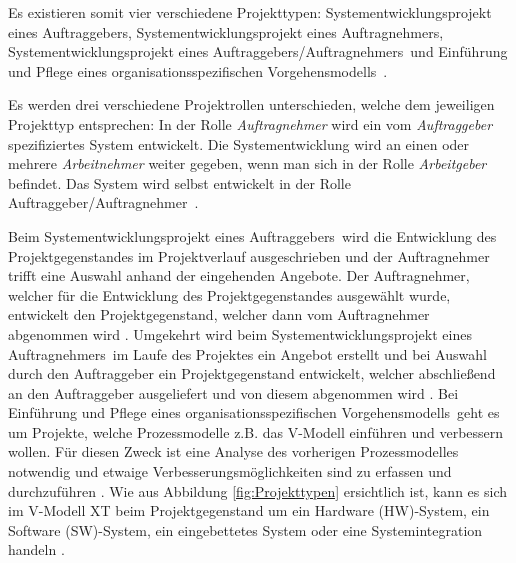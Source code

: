 Es existieren somit vier verschiedene Projekttypen: \grqq Systementwicklungsprojekt eines Auftraggebers\grqq, \grqq Systementwicklungsprojekt eines Auftragnehmers\grqq, \grqq Systementwicklungsprojekt eines Auftraggebers/Auftragnehmers\grqq \ und \grqq Einführung und Pflege eines organisationsspezifischen Vorgehensmodells\grqq \ \cite{reinhard2008}. \newline

Es werden drei verschiedene Projektrollen unterschieden, welche dem jeweiligen Projekttyp entsprechen: In der Rolle \textit{Auftragnehmer} wird ein vom \textit{Auftraggeber} spezifiziertes System entwickelt. Die Systementwicklung wird an einen oder mehrere \textit{Arbeitnehmer} weiter gegeben, wenn man sich in der Rolle \textit{Arbeitgeber} befindet. Das System  wird selbst entwickelt in der Rolle \grqq Auftraggeber/Auftragnehmer\grqq \ \cite{brack2010,2004vmodell}.\newline


Beim \grqq Systementwicklungsprojekt eines Auftraggebers\grqq \ wird die Entwicklung des Projektgegenstandes im Projektverlauf  ausgeschrieben und der Auftragnehmer trifft eine Auswahl anhand der eingehenden Angebote. Der Auftragnehmer, welcher für die Entwicklung des Projektgegenstandes ausgewählt wurde, entwickelt den Projektgegenstand, welcher dann vom Auftragnehmer abgenommen wird \cite{reinhard2008,2004vmodell}.\newline
Umgekehrt wird beim \grqq Systementwicklungsprojekt eines Auftragnehmers\grqq \ im Laufe des Projektes ein Angebot erstellt und bei Auswahl durch den Auftraggeber ein Projektgegenstand entwickelt, welcher abschließend an den Auftraggeber ausgeliefert und von diesem abgenommen wird \cite{reinhard2008,2004vmodell}.\newline
Bei \grqq Einführung und Pflege eines organisationsspezifischen Vorgehensmodells\grqq \ geht es um Projekte, welche Prozessmodelle z.B. das V-Modell einführen und verbessern wollen. Für diesen Zweck ist eine Analyse des vorherigen Prozessmodelles notwendig und etwaige Verbesserungsmöglichkeiten sind zu erfassen und durchzuführen \cite{reinhard2008,2004vmodell}.\newline
Wie aus Abbildung \ref{fig:Projekttypen} ersichtlich ist, kann es sich im V-Modell XT beim Projektgegenstand um ein Hardware (HW)-System, ein Software (SW)-System, ein eingebettetes System oder eine Systemintegration handeln \cite{brack2010,2004vmodell}. \newline

